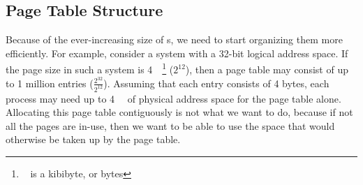 \subsection{Page Table Structure}\label{subsec:Page_Table_Structure}
Because of the ever-increasing size of s, we need to start organizing them more efficiently.
For example, consider a system with a 32-bit logical address space.
If the page size in such a system is \SI{4}{\kibi\byte}\footnote{\si{\kibi\byte} is a kibibyte, or \si[prefixes-as-symbols=false]{\kibi} bytes} ($2^{12}$), then a page table may consist of up to 1 million entries ($\frac{2^{32}}{2^{12}}$).
Assuming that each entry consists of 4 bytes, each process may need up to \SI{4}{\mebi\byte} of physical address space for the page table alone.
Allocating this page table contiguously is not what we want to do, because if not all the pages are in-use, then we want to be able to use the space that would otherwise be taken up by the page table.



